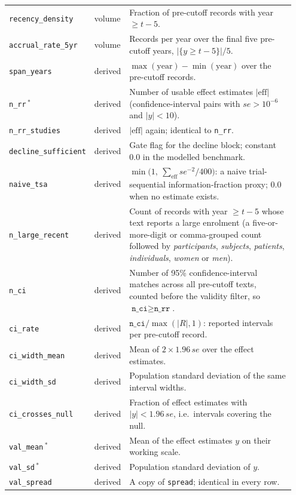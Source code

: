 \documentclass[11pt]{article}
\begin{document}
\begin{longtable}{@{}p{0.215\linewidth}p{0.105\linewidth}p{0.63\linewidth}@{}}
\texttt{recency\_density} & volume & Fraction of pre-cutoff records with year $\ge t-5$. \\
\texttt{accrual\_rate\_5yr} & volume & Records per year over the final five pre-cutoff years, $|\{y\ge t-5\}|/5$. \\
\texttt{span\_years} & derived & $\max(\text{year})-\min(\text{year})$ over the pre-cutoff records. \\
\texttt{n\_rr}\,$^{\ast}$ & derived & Number of usable effect estimates $|\mathrm{eff}|$ (confidence-interval pairs with $se>10^{-6}$ and $|y|<10$). \\
\texttt{n\_rr\_studies} & derived & $|\mathrm{eff}|$ again; identical to \texttt{n\_rr}. \\
\texttt{decline\_sufficient} & derived & Gate flag for the decline block; constant 0.0 in the modelled benchmark. \\
\texttt{naive\_tsa} & derived & $\min\!\big(1,\ \sum_{\mathrm{eff}} se^{-2}/400\big)$: a naive trial-sequential information-fraction proxy; 0.0 when no estimate exists. \\
\texttt{n\_large\_recent} & derived & Count of records with year $\ge t-5$ whose text reports a large enrolment (a five-or-more-digit or comma-grouped count followed by \emph{participants}, \emph{subjects}, \emph{patients}, \emph{individuals}, \emph{women} or \emph{men}). \\
\texttt{n\_ci} & derived & Number of 95\% confidence-interval matches across all pre-cutoff texts, counted before the validity filter, so $\texttt{n\_ci}\ge\texttt{n\_rr}$. \\
\texttt{ci\_rate} & derived & $\texttt{n\_ci}/\max(|R|,1)$: reported intervals per pre-cutoff record. \\
\texttt{ci\_width\_mean} & derived & Mean of $2\times1.96\,se$ over the effect estimates. \\
\texttt{ci\_width\_sd} & derived & Population standard deviation of the same interval widths. \\
\texttt{ci\_crosses\_null} & derived & Fraction of effect estimates with $|y|<1.96\,se$, i.e.\ intervals covering the null. \\
\texttt{val\_mean}\,$^{\ast}$ & derived & Mean of the effect estimates $y$ on their working scale. \\
\texttt{val\_sd}\,$^{\ast}$ & derived & Population standard deviation of $y$. \\
\texttt{val\_spread} & derived & A copy of \texttt{spread}; identical in every row. \\

\end{longtable}
\end{document}
